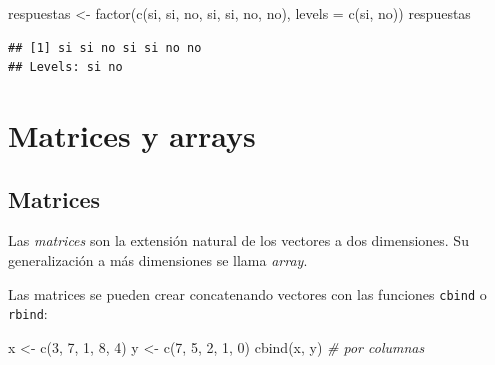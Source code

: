 \documentclass[
]{book}
\newenvironment{Shaded}{\begin{snugshade}}{\end{snugshade}}
\newcommand{\AttributeTok}[1]{\textcolor[rgb]{0.77,0.63,0.00}{#1}}
\newcommand{\CommentTok}[1]{\textcolor[rgb]{0.56,0.35,0.01}{\textit{#1}}}
\newcommand{\DecValTok}[1]{\textcolor[rgb]{0.00,0.00,0.81}{#1}}
\newcommand{\FunctionTok}[1]{\textcolor[rgb]{0.00,0.00,0.00}{#1}}
\newcommand{\NormalTok}[1]{#1}
\newcommand{\OtherTok}[1]{\textcolor[rgb]{0.56,0.35,0.01}{#1}}
\newcommand{\StringTok}[1]{\textcolor[rgb]{0.31,0.60,0.02}{#1}}
\theoremstyle{break}
\begin{document}
\begin{Shaded}
\begin{Highlighting}[]
\NormalTok{respuestas }\OtherTok{\textless{}{-}} \FunctionTok{factor}\NormalTok{(}\FunctionTok{c}\NormalTok{(}\StringTok{\textquotesingle{}si\textquotesingle{}}\NormalTok{, }\StringTok{\textquotesingle{}si\textquotesingle{}}\NormalTok{, }\StringTok{\textquotesingle{}no\textquotesingle{}}\NormalTok{, }\StringTok{\textquotesingle{}si\textquotesingle{}}\NormalTok{, }\StringTok{\textquotesingle{}si\textquotesingle{}}\NormalTok{, }\StringTok{\textquotesingle{}no\textquotesingle{}}\NormalTok{, }\StringTok{\textquotesingle{}no\textquotesingle{}}\NormalTok{), }\AttributeTok{levels =} \FunctionTok{c}\NormalTok{(}\StringTok{\textquotesingle{}si\textquotesingle{}}\NormalTok{, }\StringTok{\textquotesingle{}no\textquotesingle{}}\NormalTok{))}
\NormalTok{respuestas}
\end{Highlighting}
\end{Shaded}

\begin{verbatim}
## [1] si si no si si no no
## Levels: si no
\end{verbatim}

\hypertarget{matrices-y-arrays}{%
\section{Matrices y arrays}\label{matrices-y-arrays}}

\hypertarget{matrices}{%
\subsection{Matrices}\label{matrices}}

Las \emph{matrices} son la extensión natural de los vectores a dos dimensiones.
Su generalización a más dimensiones se llama \emph{array}.

Las matrices se pueden crear concatenando vectores
con las funciones \texttt{cbind} o \texttt{rbind}:

\begin{Shaded}
\begin{Highlighting}[]
\NormalTok{x }\OtherTok{\textless{}{-}} \FunctionTok{c}\NormalTok{(}\DecValTok{3}\NormalTok{, }\DecValTok{7}\NormalTok{, }\DecValTok{1}\NormalTok{, }\DecValTok{8}\NormalTok{, }\DecValTok{4}\NormalTok{)}
\NormalTok{y }\OtherTok{\textless{}{-}} \FunctionTok{c}\NormalTok{(}\DecValTok{7}\NormalTok{, }\DecValTok{5}\NormalTok{, }\DecValTok{2}\NormalTok{, }\DecValTok{1}\NormalTok{, }\DecValTok{0}\NormalTok{)}
\FunctionTok{cbind}\NormalTok{(x, y)  }\CommentTok{\# por columnas}
\end{Highlighting}
\end{Shaded}
\end{document}
